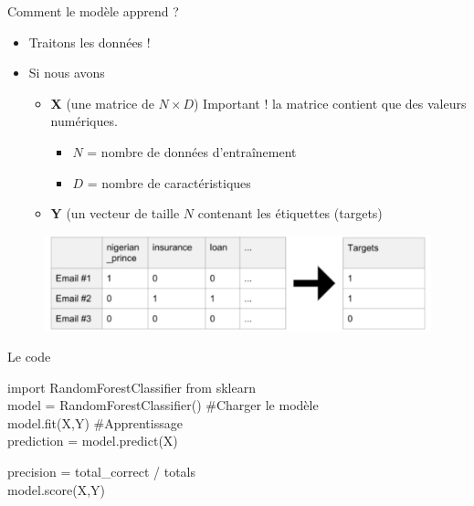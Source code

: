 \documentclass[aspectratio=169,xcolor=dvipsnames, t]{beamer}
\begin{document}
\begin{frame}{Comment le modèle apprend ?}
\begin{itemize}
	\item Traitons les données !
	\item Si nous avons
	\begin{itemize}
		\item \textbf{X} (une matrice de $N \times D $) Important ! la matrice contient que des valeurs numériques.
		\begin{itemize}
			\item $N$ = nombre de données d'entraînement
			\item $D$ = nombre de caractéristiques
		\end{itemize}
		\item \textbf{Y} (un vecteur de taille $N$ contenant les étiquettes (targets)
	\end{itemize}
\end{itemize}

	\begin{figure}
		\includegraphics[height=0.35\paperheight ]{figures/cm2_InputClassification2.png}
	\end{figure}
\end{frame}
\begin{frame}{Le code}
	
	
	\begin{example}
		import RandomForestClassifier from sklearn\\
		
		model = RandomForestClassifier() \#Charger le modèle\\
		
		model.fit(X,Y) \#Apprentissage\\
		
		prediction = model.predict(X)
	\end{example}
	
	\begin{example}
		
		precision = total\_correct / totals\\
		
		model.score(X,Y)
	\end{example}

\end{frame}
\end{document}
